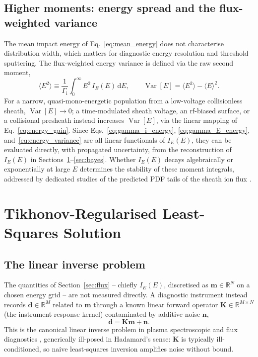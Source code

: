 \subsection{Higher moments: energy spread and the flux-weighted variance}

The mean impact energy of Eq.~\eqref{eq:mean_energy} does not characterise distribution width, which matters for diagnostic energy resolution and threshold sputtering. The flux-weighted energy variance is defined via the raw second moment,
\begin{equation}
\langle E^{2}\rangle \equiv \frac{1}{\Gamma_{\mathrm{i}}}\int_{0}^{\infty} E^{2}\,I_{E}(E)\,\mathrm{d}E,
\qquad
\operatorname{Var}[E] = \langle E^{2}\rangle - \langle E\rangle^{2}.
\label{eq:energy_variance}
\end{equation}
For a narrow, quasi-mono-energetic population from a low-voltage collisionless sheath, $\operatorname{Var}[E] \to 0$; a time-modulated sheath voltage, an rf-biased surface, or a collisional presheath instead increases $\operatorname{Var}[E]$, via the linear mapping of Eq.~\eqref{eq:energy_gain}. Since Eqs.~\eqref{eq:gamma_i_energy}, \eqref{eq:gamma_E_energy}, and~\eqref{eq:energy_variance} are all linear functionals of $I_{E}(E)$, they can be evaluated directly, with propagated uncertainty, from the reconstruction of $I_{E}(E)$ in Sections~\ref{sec:tikhonov}--\ref{sec:bayes}. Whether $I_{E}(E)$ decays algebraically or exponentially at large $E$ determines the stability of these moment integrals, addressed by dedicated studies of the predicted PDF tails of the sheath ion flux \cite{ref0096}.

\section{Tikhonov-Regularised Least-Squares Solution}
\label{sec:tikhonov}

\subsection{The linear inverse problem}

The quantities of Section~\ref{sec:flux} -- chiefly $I_{E}(E)$, discretised as $\mathbf{m} \in \mathbb{R}^{N}$ on a chosen energy grid -- are not measured directly. A diagnostic instrument instead records $\mathbf{d} \in \mathbb{R}^{M}$ related to $\mathbf{m}$ through a known linear forward operator $\mathbf{K} \in \mathbb{R}^{M\times N}$ (the instrument response kernel) contaminated by additive noise $\mathbf{n}$,
\begin{equation}
\mathbf{d} = \mathbf{K}\mathbf{m} + \mathbf{n}.
\label{eq:forward_model}
\end{equation}
This is the canonical linear inverse problem in plasma spectroscopic and flux diagnostics \cite{ref0677,ref0687}, generically ill-posed in Hadamard's sense: $\mathbf{K}$ is typically ill-conditioned, so naive least-squares inversion amplifies noise without bound.

